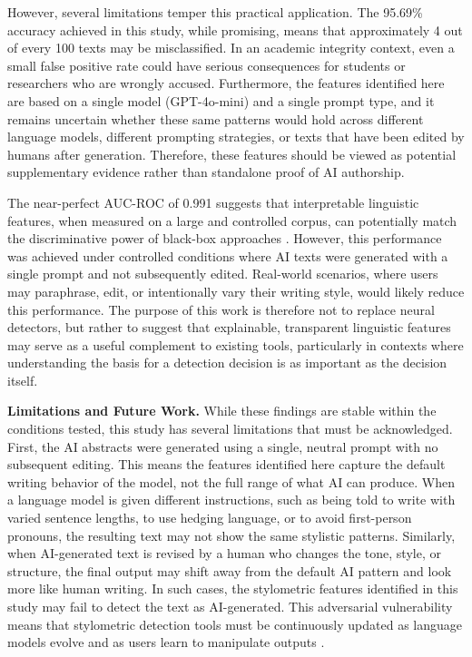 \documentclass{article}
\begin{document}
However, several limitations temper this practical application. The 95.69\% accuracy achieved in this study, while promising, means that approximately 4 out of every 100 texts may be misclassified. In an academic integrity context, even a small false positive rate could have serious consequences for students or researchers who are wrongly accused. Furthermore, the features identified here are based on a single model (GPT-4o-mini) and a single prompt type, and it remains uncertain whether these same patterns would hold across different language models, different prompting strategies, or texts that have been edited by humans after generation. Therefore, these features should be viewed as potential supplementary evidence rather than standalone proof of AI authorship.

The near-perfect AUC-ROC of 0.991 suggests that interpretable linguistic features, when measured on a large and controlled corpus, can potentially match the discriminative power of black-box approaches \cite{ref6}. However, this performance was achieved under controlled conditions where AI texts were generated with a single prompt and not subsequently edited. Real-world scenarios, where users may paraphrase, edit, or intentionally vary their writing style, would likely reduce this performance. The purpose of this work is therefore not to replace neural detectors, but rather to suggest that explainable, transparent linguistic features may serve as a useful complement to existing tools, particularly in contexts where understanding the basis for a detection decision is as important as the decision itself.

\textbf{Limitations and Future Work.} While these findings are stable within the conditions tested, this study has several limitations that must be acknowledged. First, the AI abstracts were generated using a single, neutral prompt with no subsequent editing. This means the features identified here capture the default writing behavior of the model, not the full range of what AI can produce. When a language model is given different instructions, such as being told to write with varied sentence lengths, to use hedging language, or to avoid first-person pronouns, the resulting text may not show the same stylistic patterns. Similarly, when AI-generated text is revised by a human who changes the tone, style, or structure, the final output may shift away from the default AI pattern and look more like human writing. In such cases, the stylometric features identified in this study may fail to detect the text as AI-generated. This adversarial vulnerability means that stylometric detection tools must be continuously updated as language models evolve and as users learn to manipulate outputs \cite{ref7}.
\end{document}
